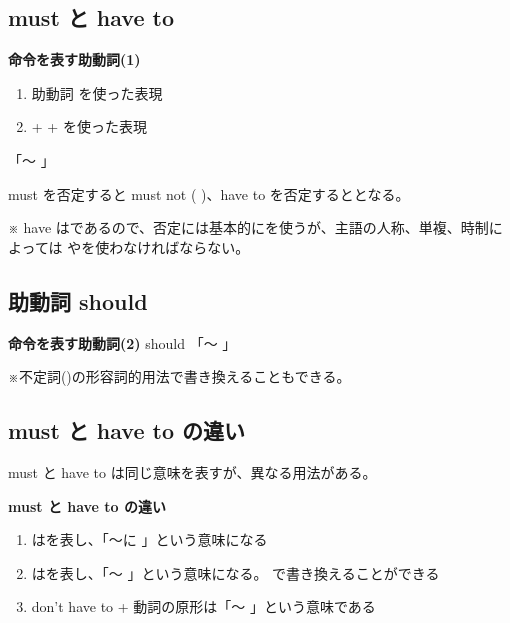 \subsection{must と have to}

\begin{definitionbox}{\textbf{命令を表す助動詞(1)}}
    \begin{enumerate}
        \item 助動詞  を使った表現
        \item {} +  + を使った表現
    \end{enumerate}

    \begin{flushright}
        「〜  」
    \end{flushright}
\end{definitionbox}
\vspace{0.5em}

    must を否定すると must not (  )、have to を否定するととなる。
    \vspace{0.5em}

    ※ have はであるので、否定には基本的にを使うが、主語の人称、単複、時制によっては
    やを使わなければならない。

\subsection{助動詞 should}

\begin{definitionbox}{\textbf{命令を表す助動詞(2)}}
    should \qquad「〜  」
\end{definitionbox}
\vspace{0.5em}

    ※不定詞()の形容詞的用法で書き換えることもできる。

\subsection{must と have to の違い}
    must と have to は同じ意味を表すが、異なる用法がある。

    \begin{theorembox}{\textbf{must と have to の違い}}
        \begin{enumerate}
            \item {} はを表し、「～に  」という意味になる
            \item {} はを表し、「～  」という意味になる。
            で書き換えることができる
            \item don't have to + 動詞の原形は「～  」という意味である
        \end{enumerate}
    \end{theorembox}

